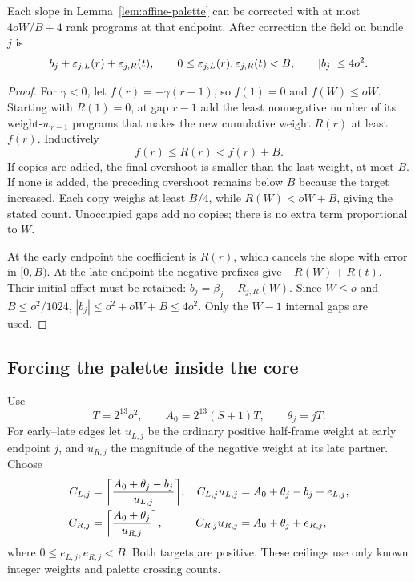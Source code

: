 \begin{lemma}\label{lem:rank-correction}
Each slope in Lemma~\ref{lem:affine-palette} can be corrected with at most $4oW/B+4$ rank programs at that endpoint. After correction the field on bundle $j$ is
\begin{equation}\label{eq:corrected-field}
b_j+\varepsilon_{j,L}(r)+\varepsilon_{j,R}(t),\qquad
0\leq\varepsilon_{j,L}(r),\varepsilon_{j,R}(t)<B,\qquad |b_j|\leq4o^2.
\end{equation}
\end{lemma}
\begin{proof}
For $\gamma<0$, let $f(r)=-\gamma(r-1)$, so $f(1)=0$ and $f(W)\leq oW$. Starting with $R(1)=0$, at gap $r-1$ add the least nonnegative number of its weight-$w_{r-1}$ programs that makes the new cumulative weight $R(r)$ at least $f(r)$. Inductively
\begin{equation}\label{eq:greedy}
f(r)\leq R(r)<f(r)+B.
\end{equation}
If copies are added, the final overshoot is smaller than the last weight, at most $B$. If none is added, the preceding overshoot remains below $B$ because the target increased. Each copy weighs at least $B/4$, while $R(W)<oW+B$, giving the stated count. Unoccupied gaps add no copies; there is no extra term proportional to $W$.

At the early endpoint the coefficient is $R(r)$, which cancels the slope with error in $[0,B)$. At the late endpoint the negative prefixes give $-R(W)+R(t)$. Their initial offset must be retained:
$b_j=\beta_j-R_{j,R}(W)$. Since $W\leq o$ and $B\leq o^2/1024$,
$|b_j|\leq o^2+oW+B\leq4o^2$. Only the $W-1$ internal gaps are used.
\end{proof}

\subsection{Forcing the palette inside the core}
Use
\[
T=2^{13}o^2,\qquad A_0=2^{13}(S+1)T,\qquad \theta_j=jT.
\]
For early--late edges let $u_{L,j}$ be the ordinary positive half-frame weight at early endpoint $j$, and $u_{R,j}$ the magnitude of the negative weight at its late partner. Choose
\begin{align}
C_{L,j}&=\ceil*{\frac{A_0+\theta_j-b_j}{u_{L,j}}},
& C_{L,j}u_{L,j}&=A_0+\theta_j-b_j+e_{L,j},\notag\\
C_{R,j}&=\ceil*{\frac{A_0+\theta_j}{u_{R,j}}},
& C_{R,j}u_{R,j}&=A_0+\theta_j+e_{R,j},
\label{eq:ordinary-counts}
\end{align}
where $0\leq e_{L,j},e_{R,j}<B$. Both targets are positive. These ceilings use only known integer weights and palette crossing counts.

